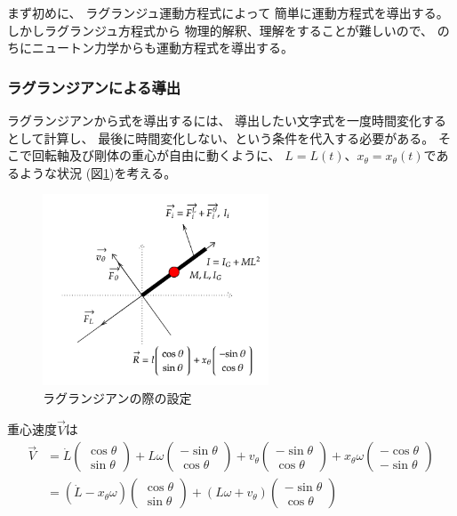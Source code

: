 \documentclass[a4paper,11pt]{jsarticle}
\begin{document}
まず初めに、
ラグランジュ運動方程式によって
簡単に運動方程式を導出する。
しかしラグランジュ方程式から
物理的解釈、理解をすることが難しいので、
のちにニュートン力学からも運動方程式を導出する。

\subsubsection{ラグランジアンによる導出}

ラグランジアンから式を導出するには、
導出したい文字式を一度時間変化するとして計算し、
最後に時間変化しない、という条件を代入する必要がある。
そこで回転軸及び剛体の重心が自由に動くように、
$L=L(t)$、$x_\theta=x_\theta(t)$であるような状況
(図\ref{Appendix_lag_config.png})を考える。

\begin{figure}[h]
  \centering
  \includegraphics[width = 0.6\textwidth]{Appendix_lag_config.png}
  \caption{ラグランジアンの際の設定}
  \label{Appendix_lag_config.png}
\end{figure}

重心速度$\vec{V}$は
\begin{align}
  \vec{V} &= 
  \dot{L}
  \begin{pmatrix}
    \cos\theta
    \\
    \sin\theta
  \end{pmatrix}
  + L\omega
  \begin{pmatrix}
    -\sin\theta
    \\
    \cos\theta
  \end{pmatrix}
  + v_\theta \begin{pmatrix}
    -\sin\theta
    \\
    \cos\theta
  \end{pmatrix}
  + x_\theta \omega \begin{pmatrix}
    -\cos\theta
    \\
    -\sin\theta
  \end{pmatrix}
  \\
  &= 
  ( \dot{L} - x_\theta \omega )
  \begin{pmatrix}
    \cos\theta
    \\
    \sin\theta
  \end{pmatrix}
  + ( L\omega + v_\theta )
  \begin{pmatrix}
    -\sin\theta
    \\
    \cos\theta
  \end{pmatrix}
\end{align}
\end{document}
